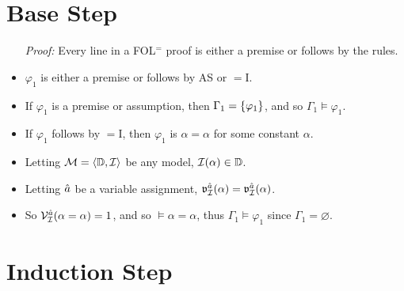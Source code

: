\documentclass[a4paper, 11pt]{article} %
\begin{document}
\section*{Base Step}

\begin{itemize}
  \item[\it Proof:] Every line in a FOL$^=$ proof is either a premise or follows by the rules.
  \item $\varphi_1$ is either a premise or follows by AS or $=$I. 
  \item If $\varphi_1$ is a premise or assumption, then $\Gamma_1=\lbrace\varphi_1\rbrace$, and so $\Gamma_1\vDash\varphi_1$.
  \item If $\varphi_1$ follows by $=$I, then $\varphi_1$ is $\alpha=\alpha$ for some constant $\alpha$. 
  \item Letting $\mathcal{M}=\langle\mathbb{D},\mathcal{I}\rangle$ be any model, $\mathcal{I}(\alpha) \in \mathbb{D}$.
  \item Letting $\hat{a}$ be a variable assignment, $\mathfrak{v}_{\mathcal{I}}^{\hat{a}}(\alpha)=\mathfrak{v}_{\mathcal{I}}^{\hat{a}}(\alpha)$.
  \item So $\mathcal{V}_{\mathcal{I}}^{\hat{a}}(\alpha=\alpha)=1$, and so $\vDash \alpha=\alpha$, thus $\Gamma_1\vDash \varphi_1$ since $\Gamma_1=\varnothing$.
\end{itemize}



\section*{Induction Step}
\end{document}
